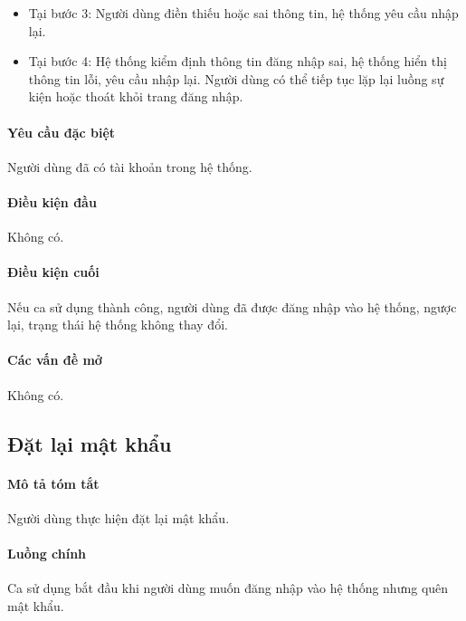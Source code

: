 \documentclass[./../main.tex]{subfiles}
\begin{document}
\begin{itemize}
	\item
	      	Tại bước 3: Người dùng điền thiếu hoặc sai thông tin, hệ thống yêu cầu
	      	nhập lại.
	\item
	      	Tại bước 4: Hệ thống kiểm định thông tin đăng nhập sai, hệ thống hiển
	      	thị thông tin lỗi, yêu cầu nhập lại. Người dùng có thể tiếp tục lặp
	      	lại luồng sự kiện hoặc thoát khỏi trang đăng nhập.
\end{itemize}

\paragraph*{Yêu cầu đặc biệt}

Người dùng đã có tài khoản trong hệ thống.

\paragraph*{Điều kiện đầu}

Không có.

\paragraph*{Điều kiện cuối}

Nếu ca sử dụng thành công, người dùng đã được đăng nhập vào hệ thống,
ngược lại, trạng thái hệ thống không thay đổi.

\paragraph*{Các vấn đề mở}

Không có.

\subsection{Đặt lại mật khẩu}
\paragraph*{Mô tả tóm tắt}

Người dùng thực hiện đặt lại mật khẩu.


\paragraph*{Luồng chính} Ca sử dụng bắt đầu khi người dùng muốn đăng nhập vào
hệ thống nhưng quên mật khẩu.
\end{document}
